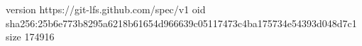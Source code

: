 version https://git-lfs.github.com/spec/v1
oid sha256:25b6e773b8295a6218b61654d966639c05117473c4ba175734e54393d048d7c1
size 174916
